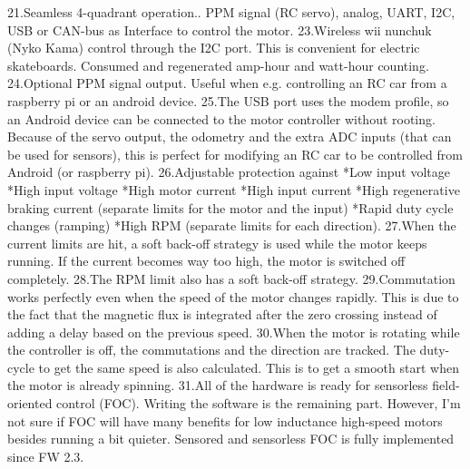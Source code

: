 \documentclass[11pt]{article}
\begin{document}
21.Seamless 4-quadrant operation.. PPM signal (RC servo), analog, UART, I2C, USB  or CAN-bus as Interface to control the motor.\newline
23.Wireless wii nunchuk (Nyko Kama) control through the I2C port. This is convenient for electric skateboards.\newline
Consumed and regenerated amp-hour and watt-hour counting.\newline
24.Optional PPM signal output. Useful when e.g. controlling an RC car from a raspberry pi or an android device.\newline
25.The USB port uses the modem profile, so an Android device can be connected to the motor controller without rooting. Because of the servo output, the odometry and the extra ADC inputs (that can be used for sensors), this is perfect for modifying an RC car to be controlled from Android (or raspberry pi).\newline
26.Adjustable protection against\newline
*Low input voltage\newline
*High input voltage\newline
*High motor current\newline
*High input current\newline
*High regenerative braking current (separate limits for the motor and the input)\newline
*Rapid duty cycle changes (ramping)\newline
*High RPM (separate limits for each direction).\newline
27.When the current limits are hit, a soft back-off strategy is used while the motor keeps running. If the current becomes way too high, the motor is switched off completely.\newline
28.The RPM limit also has a soft back-off strategy.\newline
29.Commutation works perfectly even when the speed of the motor changes rapidly. This is due to the fact that the magnetic flux is integrated after the zero crossing instead of adding a delay based on the previous speed.\newline
30.When the motor is rotating while the controller is off, the commutations and the direction are tracked. The duty-cycle to get the same speed is also calculated. This is to get a smooth start when the motor is already spinning.\newline
31.All of the hardware is ready for sensorless field-oriented control (FOC). Writing the software is the remaining part. However, I’m not sure if FOC will have many benefits for low inductance high-speed motors besides running a bit quieter. Sensored and sensorless FOC is fully implemented since FW 2.3.\newline
\end{document}
